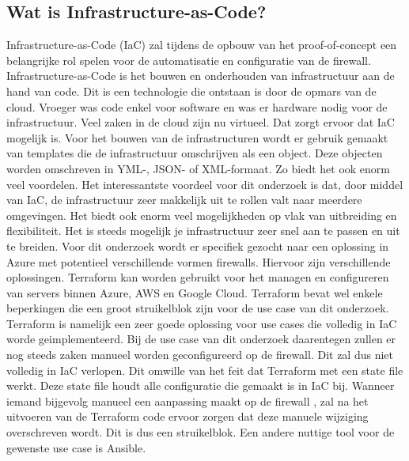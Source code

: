 \subsection*{Wat is Infrastructure-as-Code?}
Infrastructure-as-Code (IaC) zal tijdens de opbouw van het proof-of-concept een belangrijke rol spelen voor de automatisatie en configuratie van de firewall. Infrastructure-as-Code is het bouwen en onderhouden van infrastructuur aan de hand van code. Dit is een technologie die ontstaan is door de opmars van de cloud. Vroeger was code enkel voor software en was er hardware nodig voor de infrastructuur. Veel zaken in de cloud zijn nu virtueel. Dat zorgt ervoor dat IaC mogelijk is. Voor het bouwen van de infrastructuren wordt er gebruik gemaakt van templates die de infrastructuur omschrijven als een object. Deze objecten worden omschreven in YML-, JSON- of XML-formaat. Zo biedt het ook enorm veel voordelen. Het interessantste voordeel voor dit onderzoek is dat, door middel van IaC, de infrastructuur zeer makkelijk uit te rollen valt naar meerdere omgevingen. \autocite{Bulthuis} Het biedt ook enorm veel mogelijkheden op vlak van uitbreiding en flexibiliteit. Het is steeds mogelijk je infrastructuur zeer snel aan te passen en uit te breiden. \autocite{Morris2016}  Voor dit onderzoek wordt er specifiek gezocht naar een oplossing in Azure met potentieel verschillende vormen firewalls. 
Hiervoor zijn verschillende oplossingen. Terraform kan worden gebruikt voor het managen en configureren van servers binnen Azure, AWS en Google Cloud. \autocite{IONOS2019} \autocite{Janashia2020} Terraform bevat wel enkele beperkingen die een groot struikelblok zijn voor de use case van dit onderzoek. Terraform is namelijk een zeer goede oplossing voor use cases die volledig in IaC worde geimplementeerd. Bij de use case van dit onderzoek daarentegen zullen er nog steeds zaken manueel worden geconfigureerd op de firewall. Dit zal dus niet volledig in IaC verlopen. Dit omwille van het feit dat Terraform met een state file werkt. Deze state file houdt alle configuratie die gemaakt is in IaC bij. Wanneer iemand bijgevolg manueel een aanpassing maakt op de firewall , zal na het uitvoeren van de Terraform code ervoor zorgen dat deze manuele wijziging overschreven wordt. Dit is dus een struikelblok. Een andere nuttige tool voor de gewenste use case is Ansible.

